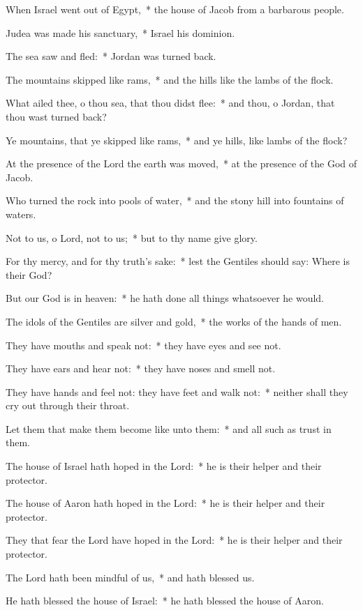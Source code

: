 \begin{enpars}
\item  When Israel went out of Egypt,~* the house of Jacob from a barbarous people.
\item  Judea was made his sanctuary,~* Israel his dominion.
\item  The sea saw and fled:~* Jordan was turned back.
\item  The mountains skipped like rams,~* and the hills like the lambs of the flock.
\item  What ailed thee, o thou sea, that thou didst flee:~* and thou, o Jordan, that thou wast turned back?
\item  Ye mountains, that ye skipped like rams,~* and ye hills, like lambs of the flock?
\item  At the presence of the Lord the earth was moved,~* at the presence of the God of Jacob.
\item  Who turned the rock into pools of water,~* and the stony hill into fountains of waters.
\item  Not to us, o Lord, not to us;~* but to thy name give glory.
\item  For thy mercy, and for thy truth’s sake:~* lest the Gentiles should say: Where is their God?
\item  But our God is in heaven:~* he hath done all things whatsoever he would.
\item  The idols of the Gentiles are silver and gold,~* the works of the hands of men.
\item  They have mouths and speak not:~* they have eyes and see not.
\item  They have ears and hear not:~* they have noses and smell not.
\item  They have hands and feel not: they have feet and walk not:~* neither shall they cry out through their throat.
\item  Let them that make them become like unto them:~* and all such as trust in them.
\item  The house of Israel hath hoped in the Lord:~* he is their helper and their protector.
\item  The house of Aaron hath hoped in the Lord:~* he is their helper and their protector.
\item  They that fear the Lord have hoped in the Lord:~* he is their helper and their protector.
\item  The Lord hath been mindful of us,~* and hath blessed us.
\item  He hath blessed the house of Israel:~* he hath blessed the house of Aaron.

\end{enpars}
